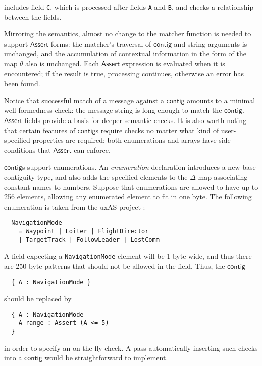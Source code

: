 \documentclass[sigplan,10pt,anonymous,review]{acmart}\settopmatter{printfolios=true,printccs=false,printacmref=false}
\newcommand{\konst}[1]{\ensuremath{\mathsf{#1}}}
\begin{document}
\noindent includes field \verb+C+, which is processed after fields
\verb+A+ and \verb+B+, and checks a relationship between the fields.

Mirroring the semantics, almost no change to the matcher function is
needed to support \konst{Assert} forms: the matcher's traversal of
\konst{contig} and string arguments is unchanged, and the accumulation of
contextual information in the form of the map $\theta$ also is
unchanged. Each \konst{Assert} expression is evaluated when it is
encountered; if the result is true, processing continues, otherwise
an error has been found.

Notice that successful match of a message against a \konst{contig} amounts to
a minimal well-formedness check: the message string is long enough to
match the \konst{contig}. \konst{Assert} fields provide a basis for deeper
semantic checks. It is also worth noting that certain features of
\konst{contig}s require checks no matter what kind of user-specified
properties are required: both enumerations and arrays have
side-conditions that \konst{Assert} can enforce.

\begin{example}
\konst{contig}s support enumerations. An \emph{enumeration} declaration
introduces a new base contiguity type, and also adds the specified
elements to the $\Delta$ map associating constant names to numbers.
Suppose that enumerations are allowed to have up to 256 elements,
allowing any enumerated element to fit in one byte. The following
enumeration is taken from the uxAS project \cite{}:
\begin{verbatim}
  NavigationMode
    = Waypoint | Loiter | FlightDirector
    | TargetTrack | FollowLeader | LostComm
\end{verbatim}

A field expecting a \verb+NavigationMode+ element will be 1 byte wide,
and thus there are 250 byte patterns that should not be allowed in the
field. Thus, the \konst{contig}

\begin{verbatim}
  { A : NavigationMode }
\end{verbatim}

should be replaced by

\begin{verbatim}
  { A : NavigationMode
    A-range : Assert (A <= 5)
  }
\end{verbatim}

\noindent in order to specify an on-the-fly check. A pass automatically
inserting such checks into a \konst{contig} would be straightforward to
implement.

\end{example}
\end{document}
